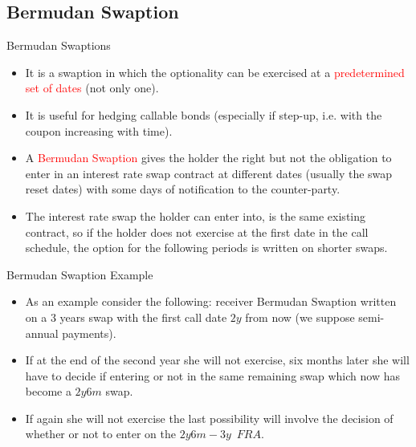 \documentclass{beamer}
\begin{document}
\subsection{Bermudan Swaption}
\begin{frame}{Bermudan Swaptions}
\begin{itemize}
	\item It is a swaption in which the optionality can be exercised at a \textcolor{red}{predetermined set of dates} (not only one).
	\item It is useful for hedging callable bonds (especially if step-up, i.e. with the coupon increasing with time).
	\item A \textcolor{red}{Bermudan Swaption} gives the holder the right but not the obligation to enter in an interest rate swap contract at different dates (usually the swap reset dates) with some days of notification to the counter-party.
	\item The interest rate swap the holder can enter into, is the same existing contract, so if the holder does not exercise at the first date in the call schedule, the option for the following periods is written on shorter swaps.
\end{itemize}
\end{frame}

\begin{frame}{Bermudan Swaption Example}
\begin{itemize}
	\item As an example consider the following: receiver Bermudan Swaption written on a 3 years swap with the first call date $2y$ from now (we suppose semi-annual payments).
	\item If at the end of the second year she will not exercise, six months later she will have to decide if entering or not in the same remaining swap which now has become a $2y6m$ swap.
	\item If again she will not exercise the last possibility will involve the decision of whether or not to enter on the $2y6m-3y$~$FRA$.
\end{itemize}
\end{frame}		
\end{document}
